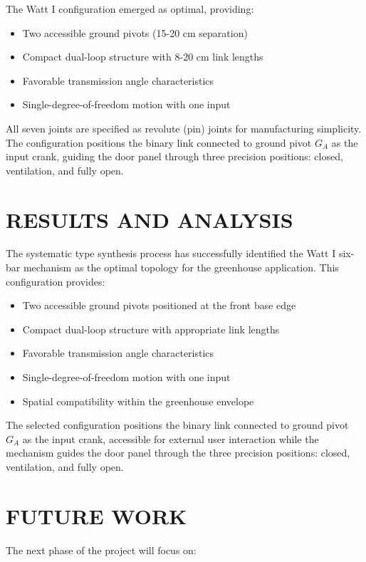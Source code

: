 \documentclass[12pt]{article}
\begin{document}
The Watt I configuration emerged as optimal, providing:
\begin{itemize}
    \item Two accessible ground pivots (15-20 cm separation)
    \item Compact dual-loop structure with 8-20 cm link lengths
    \item Favorable transmission angle characteristics
    \item Single-degree-of-freedom motion with one input
\end{itemize}

All seven joints are specified as revolute (pin) joints for manufacturing simplicity. The configuration positions the binary link connected to ground pivot $G_A$ as the input crank, guiding the door panel through three precision positions: closed, ventilation, and fully open.

\section*{RESULTS AND ANALYSIS}

The systematic type synthesis process has successfully identified the Watt I six-bar mechanism as the optimal topology for the greenhouse application. This configuration provides:

\begin{itemize}
    \item Two accessible ground pivots positioned at the front base edge
    \item Compact dual-loop structure with appropriate link lengths
    \item Favorable transmission angle characteristics
    \item Single-degree-of-freedom motion with one input
    \item Spatial compatibility within the greenhouse envelope
\end{itemize}

The selected configuration positions the binary link connected to ground pivot $G_A$ as the input crank, accessible for external user interaction while the mechanism guides the door panel through the three precision positions: closed, ventilation, and fully open.

\section*{FUTURE WORK}

The next phase of the project will focus on:
\end{document}
